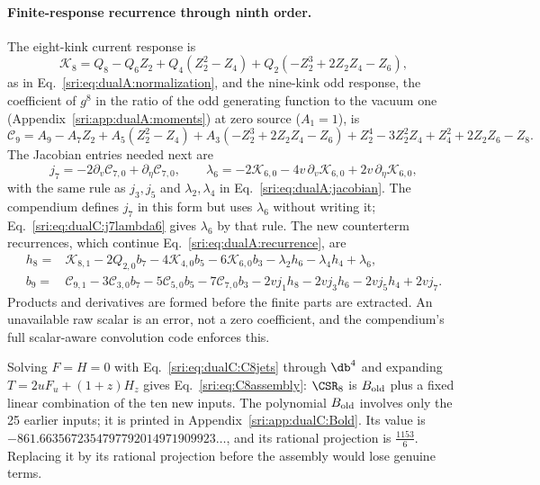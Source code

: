 \paragraph{Finite-response recurrence through ninth order.} The eight-kink current response is
\begin{equation}
 \mathcal K_8=Q_8-Q_6Z_2+Q_4(Z_2^2-Z_4)+Q_2(-Z_2^3+2Z_2Z_4-Z_6),
 \label{sri:eq:dualC:K8norm}
\end{equation}
as in Eq.~\eqref{sri:eq:dualA:normalization}, and the nine-kink odd response, the coefficient of $g^8$ in the ratio of the
odd generating function to the vacuum one (Appendix~\ref{sri:app:dualA:moments}) at zero source ($A_1=1$), is
\begin{equation}
 \mathcal C_9=A_9-A_7Z_2+A_5(Z_2^2-Z_4)+A_3(-Z_2^3+2Z_2Z_4-Z_6)+Z_2^4-3Z_2^2Z_4+Z_4^2+2Z_2Z_6-Z_8.
 \label{sri:eq:dualC:C9norm}
\end{equation}
The Jacobian entries needed next are
\begin{equation}
 j_7=-2\partial_v\mathcal C_{7,0}+\partial_\eta\mathcal C_{7,0},\qquad
 \lambda_6=-2\mathcal K_{6,0}-4v\,\partial_v\mathcal K_{6,0}+2v\,\partial_\eta\mathcal K_{6,0},
 \label{sri:eq:dualC:j7lambda6}
\end{equation}
with the same rule as $j_3,j_5$ and $\lambda_2,\lambda_4$ in Eq.~\eqref{sri:eq:dualA:jacobian}. The compendium defines
$j_7$ in this form but uses $\lambda_6$ without writing it; Eq.~\eqref{sri:eq:dualC:j7lambda6} gives $\lambda_6$ by that
rule. The new counterterm recurrences, which continue Eq.~\eqref{sri:eq:dualA:recurrence}, are
\begin{equation}
\begin{aligned}
 h_8={}&\mathcal K_{8,1}-2Q_{2,0}b_7-4\mathcal K_{4,0}b_5-6\mathcal K_{6,0}b_3-\lambda_2h_6-\lambda_4h_4+\lambda_6,\\
 b_9={}&\mathcal C_{9,1}-3\mathcal C_{3,0}b_7-5\mathcal C_{5,0}b_5-7\mathcal C_{7,0}b_3
 -2vj_1h_8-2vj_3h_6-2vj_5h_4+2vj_7.
\end{aligned}
\label{sri:eq:dualC:b9}
\end{equation}
Products and derivatives are formed before the finite parts are extracted. An unavailable raw scalar is an error, not a
zero coefficient, and the compendium's full scalar-aware convolution code enforces this.

Solving $F=H=0$ with Eq.~\eqref{sri:eq:dualC:C8jets} through $\db^4$ and expanding $T=2uF_u+(1+z)H_z$ gives
Eq.~\eqref{sri:eq:C8assembly}: $\CSR_8$ is $B_{\rm old}$ plus a fixed linear combination of the ten new inputs. The
polynomial $B_{\rm old}$ involves only the 25 earlier inputs; it is printed in Appendix~\ref{sri:app:dualC:Bold}. Its value is
$-861.6635672354797792014971909923\ldots$, and its rational projection is $\frac{1153}{6}$. Replacing it by its
rational projection before the assembly would lose genuine terms.

